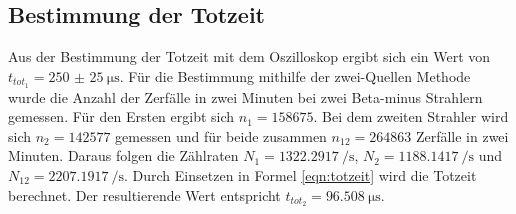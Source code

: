 \subsection{Bestimmung der Totzeit}
Aus der Bestimmung der Totzeit mit dem Oszilloskop ergibt sich ein Wert von $t_{tot_{1}}=\qty{250(25)}{\micro\second}$.
Für die Bestimmung mithilfe der zwei-Quellen Methode wurde die Anzahl der Zerfälle in zwei Minuten bei zwei Beta-minus Strahlern gemessen.
Für den Ersten ergibt sich $n_1=158675$.
Bei dem zweiten Strahler wird sich $n_2=142577$ gemessen und für beide zusammen $n_{12}=264863$ Zerfälle in zwei Minuten.
Daraus folgen die Zählraten $N_1=\qty{1322.2917}{\per\second}$, $N_2=\qty{1188.1417}{\per\second}$ und $N_{12}=\qty{2207.1917}{\per\second}$.
Durch Einsetzen in Formel \ref{eqn:totzeit} wird die Totzeit berechnet.
Der resultierende Wert entspricht $t_{tot_2}=\qty{96.508}{\micro\second}$.